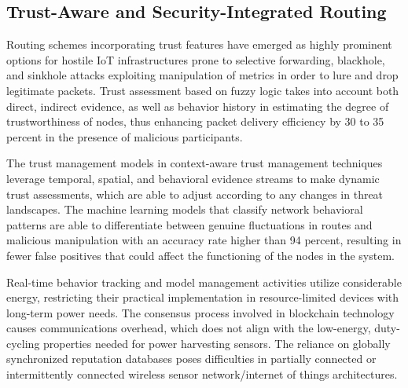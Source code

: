 \documentclass[a4paper,fleqn]{cas-dc}
\numberwithin{equation}{section}
\begin{document}
\subsection{Trust-Aware and Security-Integrated Routing}
\label{subsec:lit_trust}

Routing schemes incorporating trust features have emerged as highly
prominent options for hostile IoT infrastructures prone to selective
forwarding, blackhole, and sinkhole attacks exploiting manipulation
of metrics in order to lure and drop legitimate packets.
\cite{Harbi2023BlockchainIoDSecurity,R10_Dinde2024BlockchainIoTIntegration} Trust assessment based on fuzzy logic takes into account
both direct, indirect evidence, as well as behavior history in
estimating the degree of trustworthiness of nodes, thus enhancing
packet delivery efficiency by 30 to 35 percent in the presence of
malicious participants.

The trust management models in context-aware trust management
techniques leverage temporal, spatial, and behavioral evidence streams
to make dynamic trust assessments, which are able to adjust according
to any changes in threat landscapes.\cite{Sabrina2022BlockchainSecureIoT,R18_Alzoubi2024BlockchainIoT}
The machine learning models that classify network behavioral patterns
are able to differentiate between genuine fluctuations in routes and
malicious manipulation with an accuracy rate higher than 94 percent,
resulting in fewer false positives that could affect the functioning
of the nodes in the system.

Real-time behavior tracking and model management activities utilize
considerable energy, restricting their practical implementation in
resource-limited devices with long-term power needs.
\cite{R19_Falch2025TechnoEconomicsIoTOT} The consensus process
involved in blockchain technology causes communications overhead,
which does not align with the low-energy, duty-cycling
properties needed for power harvesting sensors. The reliance on
globally synchronized reputation databases poses difficulties in
partially connected or intermittently connected wireless sensor
network/internet of things architectures.
\end{document}
